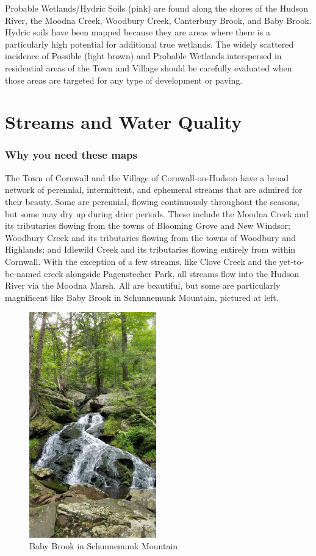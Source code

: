 Probable Wetlands/Hydric Soils (pink) are found along the shores of the Hudson 
River, the Moodna Creek, Woodbury Creek, Canterbury Brook, and Baby Brook. 
Hydric soils have been mapped because they are areas where there is a 
particularly high potential for additional true wetlands. The widely scattered 
incidence of Possible (light brown) and Probable Wetlands interspersed in 
residential areas of the Town and Village should be carefully evaluated when 
those areas are targeted for any type of development or paving.
\label{map:wetlandsandhydricsoils}

\chapter{Streams and Water Quality}\label{subsec:streamsquality}
\subsection*{Why you need these maps}
The Town of Cornwall and the Village of Cornwall-on-Hudson have a broad network 
of perennial, intermittent, and ephemeral streams that are admired for their 
beauty. Some are perennial, flowing continuously throughout the seasons, but 
some may dry up during drier periods. These include the Moodna Creek and its 
tributaries flowing from the towns of Blooming Grove and New Windsor; Woodbury 
Creek and its tributaries flowing from the towns of Woodbury and Highlands; and 
Idlewild Creek and its tributaries flowing entirely from within Cornwall. With 
the exception of a few streams, like Clove Creek and the yet-to-be-named creek 
alongside Pagenstecher Park, all streams flow into the Hudson River via the 
Moodna Marsh. All are beautiful, but some are particularly magnificent like Baby 
Brook in Schunnemunk Mountain, pictured at left.
\begin{figure} %
    \includegraphics[width=5.5cm, keepaspectratio]{images/stream.jpg}
  \caption{Baby Brook in Schunnemunk Mountain}\label{fig:bablingbrook}
\end{figure}

